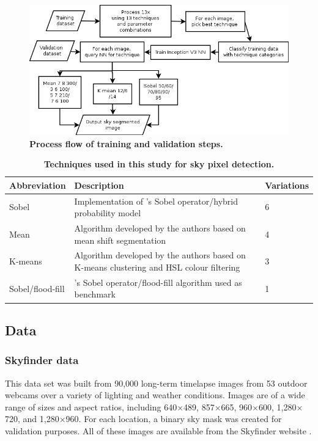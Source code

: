 \documentclass[final,3p,times,authoryear]{elsarticle}
\begin{document}
\begin{figure}
\centering    
\includegraphics[scale=0.60]{Images/TrainingProcessDiagram}
\caption{\bf Process flow of training and validation steps.}    
 \label{fig:process}  
\end{figure} 

\begin{table}[!htbp]
\caption{\bf Techniques used in this study for sky pixel detection.  \label{tab:techniques}}     
\begin{tabular}{ l l l}
\textbf{Abbreviation} & \textbf{Description} & \textbf{Variations}  \\ \hline
Sobel  & Implementation of \cite{Wang2015a}'s Sobel operator/hybrid probability model & 6 \\	
Mean & Algorithm developed by the authors based on mean shift segmentation &4 \\
K-means  & Algorithm developed by the authors based on K-means clustering and HSL colour filtering &3 \\
\hline
Sobel/flood-fill  & \cite{Middel2018}'s Sobel operator/flood-fill algorithm used as benchmark &1 \\
\hline
\end{tabular}
\end{table}


\subsection{Data}\label{sec:data}

\subsubsection{Skyfinder data}\label{sec:finderdata}
This data set was built from 90,000 long-term timelapse images from 53 outdoor webcams over a variety of lighting and weather conditions. Images are of a wide range of sizes and aspect ratios, including 640$\times$489, 857$\times$665, 960$\times$600, 1,280$\times$720, and 1,280$\times$960. For each location, a binary sky mask was created for validation purposes. All of these images are available from the Skyfinder website \citep{Mihail2015}.
\end{document}
